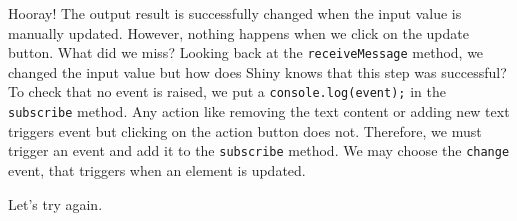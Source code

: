 \documentclass[]{book}
\newenvironment{Shaded}{\begin{snugshade}}{\end{snugshade}}
\newcommand{\AttributeTok}[1]{\textcolor[rgb]{0.77,0.63,0.00}{#1}}
\newcommand{\KeywordTok}[1]{\textcolor[rgb]{0.13,0.29,0.53}{\textbf{#1}}}
\newcommand{\NormalTok}[1]{#1}
\newcommand{\OperatorTok}[1]{\textcolor[rgb]{0.81,0.36,0.00}{\textbf{#1}}}
\newcommand{\StringTok}[1]{\textcolor[rgb]{0.31,0.60,0.02}{#1}}
\begin{document}
Hooray! The output result is successfully changed when the input value is manually updated. However, nothing happens when we click on the update button. What did we miss? Looking back at the \texttt{receiveMessage} method, we changed the input value but how does Shiny knows that this step was successful? To check that no event is raised, we put a \texttt{console.log(event);} in the \texttt{subscribe} method. Any action like removing the text content or adding new text triggers event but clicking on the action button does not. Therefore, we must trigger an event and add it to the \texttt{subscribe} method. We may choose the \texttt{change} event, that triggers when an element is updated.

\begin{Shaded}
\end{Shaded}

Let's try again.
\end{document}
